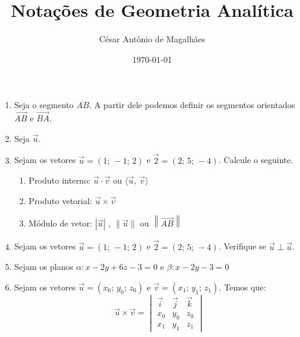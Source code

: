 \documentclass[12pt,a4paper]{article}
\title{Notações de Geometria Analítica}
\author{César Antônio de Magalhães}
\date{\today}
\begin{document}
	\begin{enumerate}
		\item Seja o segmento $\overline{AB}$. A partir dele podemos definir os segmentos orientados
		$\overrightarrow{AB}$ e $\overrightarrow{BA}$.
		\item Seja $\vec{u}$.
		\item Sejam os vetores $\vec{u} = (1;\, -1;\, 2)$ e $\vec{2} = (2;\, 5;\, -4)$. Calcule o seguinte.
		\begin{enumerate}
			\item Produto interno: $\vec{u} \cdot \vec{v}$ ou $\langle \vec{u},\, \vec{v} \rangle$
			\item Produto vetorial: $\vec{u} \times \vec{v}$
			\item Módulo de vetor: $|\vec{u}|$ , $\|\vec{u}\|$ ou $\left\| \overrightarrow{AB} \right\|$
		\end{enumerate}
		\item Sejam os vetores $\vec{u} = (1;\, -1;\, 2)$ e $\vec{2} = (2;\, 5;\, -4)$. Verifique se $\vec{u} \perp \vec{u}$.
		\item Sejam os planos $\alpha : x - 2y + 6z - 3 = 0$ e $\beta : x - 2y -3 = 0$
		\item Sejam os vetores $\vec{u} = (x_0;\, y_0;\, z_0)$ e $\vec{v} = (x_1;\, y_1;\, z_1)$. Temos que: 
		$$\vec{u} \times \vec{v} = 
		\begin{vmatrix}
			\vec{i} & \vec{j} & \vec{k} \\
			x_0 & y_0 & z_0 \\
			x_1 & y_1 & z_1
		\end{vmatrix}$$		
	\end{enumerate}	
\end{document}
